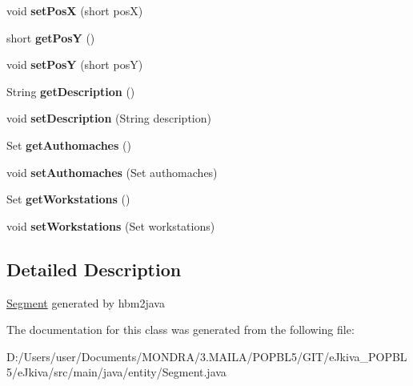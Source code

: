 \begin{DoxyCompactItemize}
void {\bfseries set\+PosX} (short posX)
\item 
\mbox{\label{classentity_1_1_segment_a49e9f7232f10a5d429f82782a96be138}} 
short {\bfseries get\+PosY} ()
\item 
\mbox{\label{classentity_1_1_segment_a6ce06e8e4f24903d09ae2c73505035d0}} 
void {\bfseries set\+PosY} (short posY)
\item 
\mbox{\label{classentity_1_1_segment_a8ac2a6c8d6e1948962c6dd6090c0fe36}} 
String {\bfseries get\+Description} ()
\item 
\mbox{\label{classentity_1_1_segment_a7bea5d3fe2bc567b8f1b66c352a60b1c}} 
void {\bfseries set\+Description} (String description)
\item 
\mbox{\label{classentity_1_1_segment_a292b54976ba0f33d4e044cc19c11392a}} 
Set {\bfseries get\+Authomaches} ()
\item 
\mbox{\label{classentity_1_1_segment_a28268832dcb0948d5cbbba6a442fb883}} 
void {\bfseries set\+Authomaches} (Set authomaches)
\item 
\mbox{\label{classentity_1_1_segment_a428afaed05b1f5e1234de6fecc446759}} 
Set {\bfseries get\+Workstations} ()
\item 
\mbox{\label{classentity_1_1_segment_a2f5476f699a728f71efd890d6d9e1ef0}} 
void {\bfseries set\+Workstations} (Set workstations)
\end{DoxyCompactItemize}


\subsection{Detailed Description}
\mbox{\hyperlink{classentity_1_1_segment}{Segment}} generated by hbm2java 

The documentation for this class was generated from the following file\+:\begin{DoxyCompactItemize}
\item 
D\+:/\+Users/user/\+Documents/\+M\+O\+N\+D\+R\+A/3.\+M\+A\+I\+L\+A/\+P\+O\+P\+B\+L5/\+G\+I\+T/e\+Jkiva\+\_\+\+P\+O\+P\+B\+L5/e\+Jkiva/src/main/java/entity/Segment.\+java\end{DoxyCompactItemize}
